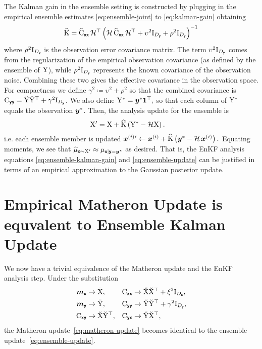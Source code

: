 \documentclass[wcp]{jmlr} %
\begin{document}
The Kalman gain in the ensemble setting is constructed by plugging in the empirical ensemble estimates \eqref{eq:ensemble-joint} to \eqref{eq:kalman-gain} obtaining
\begin{align}
\widehat{\mathrm{K}}= \widehat{\mathrm{C}}_{\boldsymbol{\mathsf{xx}}}\, \mathcal{H}^\top \left(\mathcal{H}\,\widehat{\mathrm{C}}_{\boldsymbol{\mathsf{xx}}}\,\mathcal{H}^\top + \upsilon^2\mathrm{I}_{D_{\boldsymbol{\mathsf{y}}}} + \rho^2\mathrm{I}_{D_{\boldsymbol{\mathsf{y}}}}\right)^{-1}\label{eq:ensemble-kalman-gain}
\end{align}
where \(\rho^2\mathrm{I}_{D_{\boldsymbol{\mathsf{y}}}}\) is the observation error covariance matrix.
The term
\(\upsilon^2\mathrm{I}_{D_{\boldsymbol{\mathsf{y}}}}\) comes from the regularization of the empirical observation covariance (as defined by the ensemble of
\(\mathrm{Y}\)), while \(\rho^2\mathrm{I}_{D_{\boldsymbol{\mathsf{y}}}}\) represents the known covariance of the observation noise.
Combining these two gives the effective covariance in the observation space.
For compactness we define \(\gamma^2 \coloneq \upsilon^2 + \rho^2\) so that the combined covariance is \(\mathrm{C}_{\boldsymbol{\mathsf{yy}}} = \breve{\mathrm{Y}} \breve{\mathrm{Y}}^\top + \gamma^2\mathrm{I}_{D_{\boldsymbol{\mathsf{y}}}}\).
We also define
$\mathrm{Y}^* = \boldsymbol{y}^* \mathbf{1}^\top,$
so that each column of \(\mathrm{Y}^*\) equals the observation \(\boldsymbol{y}^*\). Then, the analysis update for the ensemble is
\begin{align}
    \mathrm{X}' &= \mathrm{X} + \widehat{\mathrm{K}} \left(\mathrm{Y}^* - \mathcal{H}\mathrm{X}\right).\label{eq:ensemble-update}
\end{align}
i.e. each ensemble member is updated
\(\boldsymbol{x}^{(i)}{}' \gets \boldsymbol{x}^{(i)} + \widehat{\mathrm{K}} \left(\boldsymbol{y}^* - \mathcal{H}\,\boldsymbol{x}^{(i)}\right).\)
Equating moments, we see that
\(\ELaw[\vrv{x}\sim \mm{X}']
\approx \Law[\vrv{x} \gvn \vrv{y}=\vv{y}^*] \) as desired.
That is, the EnKF analysis equations \eqref{eq:ensemble-kalman-gain} and \eqref{eq:ensemble-update} can be justified in terms of an empirical approximation to the Gaussian posterior update.

\section{Empirical Matheron Update is equvalent to Ensemble Kalman Update}
We now have a trivial equivalence of the Matheron update and the EnKF analysis step.
Under the substitution
\begin{align}
    \boldsymbol{m}_{\boldsymbol{\mathsf{x}}} &\to \bar{\mathrm{X}}, & \mathrm{C}_{\boldsymbol{\mathsf{xx}}} &\to \breve{\mathrm{X}} \breve{\mathrm{X}}^\top + \xi^2\mathrm{I}_{D_{\boldsymbol{\mathsf{x}}}},\\
    \boldsymbol{m}_{\boldsymbol{\mathsf{y}}} &\to \bar{\mathrm{Y}}, & \mathrm{C}_{\boldsymbol{\mathsf{yy}}} &\to \breve{\mathrm{Y}} \breve{\mathrm{Y}}^\top + \gamma^2\mathrm{I}_{D_{\boldsymbol{\mathsf{y}}}},\\
    \mathrm{C}_{\boldsymbol{\mathsf{xy}}} &\to \breve{\mathrm{X}} \breve{\mathrm{Y}}^\top, & \mathrm{C}_{\boldsymbol{\mathsf{yx}}} &\to \breve{\mathrm{Y}} \breve{\mathrm{X}}^\top,
\end{align}
the Matheron update~\eqref{eq:matheron-update} becomes identical to the ensemble update~\eqref{eq:ensemble-update}.
\end{document}
